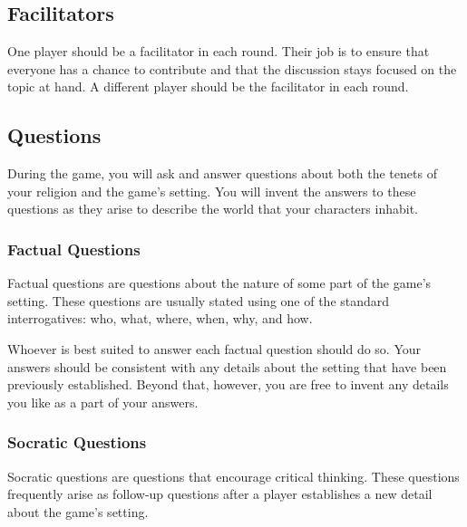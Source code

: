 \documentclass[a6paper, 11pt, parskip=half, DIV=15]{scrartcl}
\begin{document}
\subsection*{Facilitators}
One player should be a facilitator in each round. Their job is to ensure that everyone has a chance to contribute and that the discussion stays focused on the topic at hand. A different player should be the facilitator in each round.

\newpage
\enlargethispage{1.75\baselineskip}

\subsection*{Questions}
During the game, you will ask and answer questions about both the tenets of your religion and the game's setting.
You will invent the answers to these questions as they arise to describe the world that your characters inhabit.

\subsubsection*{Factual Questions}

Factual questions are questions about the nature of some part of the game's setting.
These questions are usually stated using one of the standard interrogatives: who, what, where, when, why, and how.

%
%

Whoever is best suited to answer each factual question should do so.
Your answers should be consistent with any details about the setting that have been previously established.
Beyond that, however, you are free to invent any details you like as a part of your answers.

\newpage
\enlargethispage{1.75\baselineskip}

\subsubsection*{Socratic Questions}
Socratic questions are questions that encourage critical thinking.
These questions frequently arise as follow-up questions after a player establishes a new detail about the game's setting.
\end{document}
